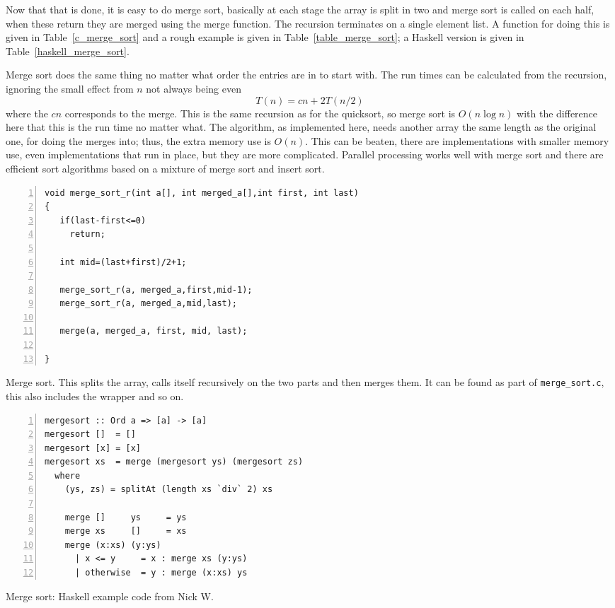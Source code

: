 \documentclass[11pt,a4paper]{scrartcl}
\begin{document}
Now that that is done, it is easy to do merge sort, basically at each
stage the array is split in two and merge sort is called on each half,
when these return they are merged using the merge function. The
recursion terminates on a single element list. A function for doing
this is given in Table~\ref{c_merge_sort} and a rough example is given
in Table~\ref{table_merge_sort}; a Haskell version is given in Table~\ref{haskell_merge_sort}.

Merge sort does the same thing no matter what order the entries are in
to start with. The run times can be calculated from the recursion,
ignoring the small effect from $n$ not always being even
\begin{equation}
T(n)=cn+2T(n/2)
\end{equation}
where the $cn$ corresponds to the merge. This is the same recursion as
for the quicksort, so merge sort is $O(n\log{n})$ with the difference
here that this is the run time no matter what. The algorithm, as
implemented here, needs another array the same length as the original
one, for doing the merges into; thus, the extra memory use is
$O(n)$. This can be beaten, there are implementations with smaller
memory use, even implementations that run in place, but they are more
complicated. Parallel processing works well with merge sort and there
are efficient sort algorithms based on a mixture of merge sort and
insert sort.

\begin{table}
\begin{lstlisting}[numbers=left]
void merge_sort_r(int a[], int merged_a[],int first, int last)
{
   if(last-first<=0)
     return;

   int mid=(last+first)/2+1;

   merge_sort_r(a, merged_a,first,mid-1);
   merge_sort_r(a, merged_a,mid,last);

   merge(a, merged_a, first, mid, last);

}
\end{lstlisting}
\caption{Merge sort. This splits the array, calls itself recursively
  on the two parts and then merges them. It can be found as part of
  \texttt{merge\_sort.c}, this also includes the wrapper and so
  on. \label{c_merge_sort}}
\end{table}


\begin{table}
\begin{lstlisting}[numbers=left]
mergesort :: Ord a => [a] -> [a]
mergesort []  = []
mergesort [x] = [x]
mergesort xs  = merge (mergesort ys) (mergesort zs)
  where
    (ys, zs) = splitAt (length xs `div` 2) xs

    merge []     ys     = ys
    merge xs     []     = xs
    merge (x:xs) (y:ys)
      | x <= y     = x : merge xs (y:ys)
      | otherwise  = y : merge (x:xs) ys
\end{lstlisting}
\caption{Merge sort: Haskell example code from Nick W. \label{haskell_merge_sort}}
\end{table}
\end{document}
